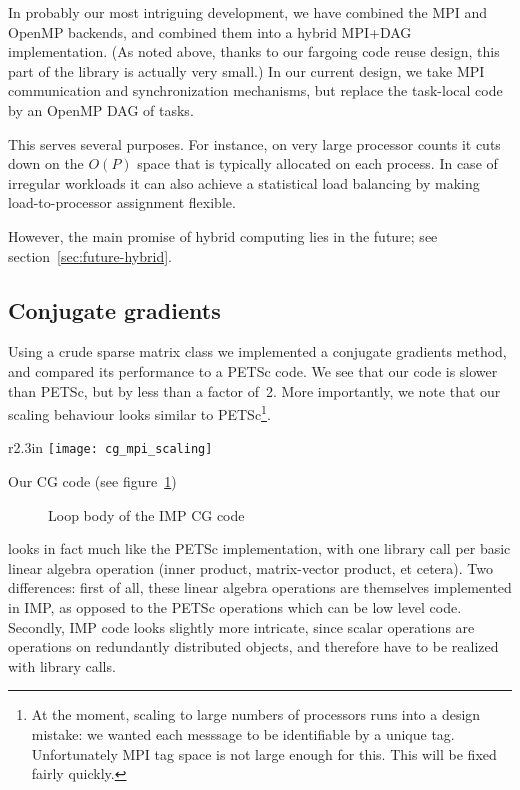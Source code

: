 \documentclass[11pt,fleqn,preprint]{impreport}
\begin{document}
In probably our most intriguing development, we have combined the MPI
and OpenMP backends, and combined them into a hybrid MPI+DAG implementation.
(As noted above, thanks to our fargoing code reuse design, this
part of the library is actually very small.)
In our current design, we take MPI communication and synchronization
mechanisms, but replace the 
task-local code by an OpenMP \ac{DAG} of tasks.

This serves several purposes. For instance, on very large processor counts
it cuts down on the $O(P)$ space that is typically allocated on each
process. In case of irregular workloads it can also achieve a statistical
load balancing by making load-to-processor assignment flexible.

However, the main promise of hybrid computing lies in the future; see
section~\ref{sec:future-hybrid}.

\subsection{Conjugate gradients}

Using a crude sparse matrix class we implemented a conjugate gradients
method, and compared its performance to a PETSc code. We see that our
code is slower than PETSc, but by less than a factor of~2. More
importantly, we note that our scaling behaviour looks similar to
PETSc\footnote {At the moment, scaling to large numbers of processors
  runs into a design mistake: we wanted each messsage to be
  identifiable by a unique tag. Unfortunately MPI tag space is not
  large enough for this.  This will be fixed fairly quickly.}.

\begin{wrapfigure}{r}{2.3in}
  \texttt{[image: cg\_mpi\_scaling]}
\end{wrapfigure}
%
Our CG code (see figure~\ref{fig:cgtemplate})
%
\begin{figure}[p]
  \caption{Loop body of the IMP CG code}
  \label{fig:cgtemplate}
\end{figure}
%
looks in fact much like the PETSc implementation, with one
library call per basic linear algebra operation (inner product, matrix-vector
product, et cetera). Two differences: first of all, these linear algebra operations
are themselves implemented in IMP, as opposed to the PETSc operations which can
be low level code. Secondly, IMP code looks slightly more intricate, since scalar operations
are operations on redundantly distributed objects, and therefore have to be realized
with library calls.
\end{document}
